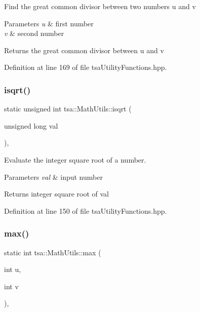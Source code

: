Find the great common divisor between two numbers u and v


\begin{DoxyParams}{Parameters}
{\em u} & first number \\
\hline
{\em v} & second number\\
\hline
\end{DoxyParams}
\begin{DoxyReturn}{Returns}
the great common divisor between u and v 
\end{DoxyReturn}


Definition at line 169 of file tsa\+Utility\+Functions.\+hpp.

\mbox{\label{classtsa_1_1_math_utils_a4d4f3e95ae31cf490baec26aa6babba6}} 
\subsubsection{\texorpdfstring{isqrt()}{isqrt()}}
{\footnotesize\ttfamily static unsigned int tsa\+::\+Math\+Utils\+::isqrt (\begin{DoxyParamCaption}\item[{unsigned long}]{val }\end{DoxyParamCaption})\hspace{0.3cm}{\ttfamily [inline]}, {\ttfamily [static]}}

Evaluate the integer square root of a number.


\begin{DoxyParams}{Parameters}
{\em val} & input number\\
\hline
\end{DoxyParams}
\begin{DoxyReturn}{Returns}
integer square root of val 
\end{DoxyReturn}


Definition at line 150 of file tsa\+Utility\+Functions.\+hpp.

\mbox{\label{classtsa_1_1_math_utils_a52fe9c7e80f1facb7dd118491786ad27}} 
\subsubsection{\texorpdfstring{max()}{max()}}
{\footnotesize\ttfamily static int tsa\+::\+Math\+Utils\+::max (\begin{DoxyParamCaption}\item[{int}]{u,  }\item[{int}]{v }\end{DoxyParamCaption})\hspace{0.3cm}{\ttfamily [inline]}, {\ttfamily [static]}}



